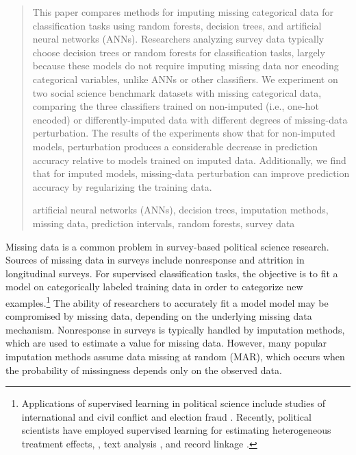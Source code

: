 \documentclass[10pt]{book}
\theoremstyle{definition}
\begin{document}
\begin{quotation}
This paper compares methods for imputing missing categorical data for classification tasks using random forests, decision trees, and artificial neural networks (ANNs). Researchers analyzing survey data typically choose decision trees or random forests for classification tasks, largely because these models do not require imputing missing data nor encoding categorical variables, unlike ANNs or other classifiers. We experiment on two social science benchmark datasets with missing categorical data, comparing the three classifiers trained on non-imputed (i.e., one-hot encoded) or differently-imputed data with different degrees of missing-data perturbation. The results of the experiments show that for non-imputed models, perturbation produces a considerable decrease in prediction accuracy relative to models trained on imputed data. Additionally, we find that for imputed models, missing-data perturbation can improve prediction accuracy by regularizing the training data. \par

\vspace{9pt}
artificial neural networks (ANNs), decision trees,  imputation methods, missing data,  prediction intervals, random forests, survey data
\par
\end{quotation}\par



\def\thefigure{\arabic{figure}}
\def\thetable{\arabic{table}}

\fontsize{12}{14pt plus.8pt minus .6pt}\selectfont

\newpage %

\setcounter{chapter}{1}
\setcounter{equation}{0} %
\setcounter{page}{1} %

Missing data is a common problem in survey-based political science research. Sources of missing data in surveys include nonresponse and attrition in longitudinal surveys. For supervised classification tasks, the objective is to fit a model on categorically labeled training data in order to categorize new examples.\footnote{Applications of supervised learning in political science include studies of international and civil conflict\citep{beck2000,de2004,hill2014,muchlinski2016} and election fraud \citep{cantu2011,montgomery2015}. Recently, political scientists have employed supervised learning for estimating heterogeneous treatment effects, \citep{imai2011,green2012, imai2013, grimmer2014}, text analysis \citep{quinn2010,hopkins2010,grimmer2013,lauderdale2014,wilkerson2015}, and record linkage \citep{giraud2010}.} The ability of researchers to accurately fit a model model may be compromised by missing data, depending on the underlying missing data mechanism. Nonresponse in surveys is typically handled by imputation methods, which are used to estimate a value for missing data. However, many popular imputation methods assume data missing at random (MAR), which occurs when the probability of missingness depends only on the observed data. 
\end{document}
